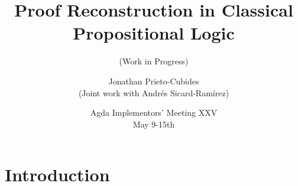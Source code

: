 \documentclass[xetex, hyperref={pdfpagelabels=false}]{beamer}
\title[Proof Reconstruction in Classical Propositional Logic]
  {\textbf{Proof Reconstruction in Classical Propositional Logic}
}
\subtitle{(Work in Progress)}
\date{Agda Implementors’ Meeting XXV\\
May 9-15th}
\author[Jonathan Prieto-Cubides and Andr\'es Sicard-Ram\'irez]{Jonathan Prieto-Cubides\\
(Joint work with Andr\'es Sicard-Ram\'irez)}
\institute{
Universidad EAFIT\\
Medell\'in, Colombia}
\begin{document}
\setcounter{page}{1}



\begin{frame}[plain]
\titlepage
\end{frame}


\section{Introduction}
\end{document}
